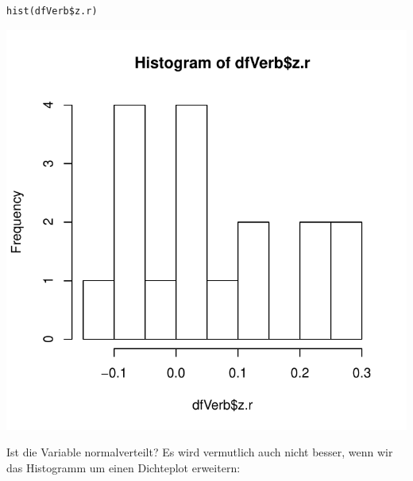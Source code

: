 \documentclass[normalheadings, 10pt]{scrartcl}\usepackage{graphicx, color}
\makeatletter
\def\maxwidth{ %
  \ifdim\Gin@nat@width>\linewidth
    \linewidth
  \else
    \Gin@nat@width
  \fi
}
\newenvironment{kframe}{%
 \def\at@end@of@kframe{}%
 \ifinner\ifhmode%
  \def\at@end@of@kframe{\end{minipage}}%
  \begin{minipage}{\columnwidth}%
 \fi\fi%
 \def\FrameCommand##1{\hskip\@totalleftmargin \hskip-\fboxsep
 \colorbox{shadecolor}{##1}\hskip-\fboxsep
     \hskip-\linewidth \hskip-\@totalleftmargin \hskip\columnwidth}%
 \MakeFramed {\advance\hsize-\width
   \@totalleftmargin\z@ \linewidth\hsize
   \@setminipage}}%
 {\par\unskip\endMakeFramed%
 \at@end@of@kframe}
\newenvironment{knitrout}{}{} %
\makeatother
\begin{document}
\begin{rbsp}
\begin{knitrout}
\color{fgcolor}\begin{kframe}
\begin{verbatim}
hist(dfVerb$z.r)
\end{verbatim}
\end{kframe}
\includegraphics[width=\maxwidth]{fig/assign-1-1-11_2} 

\end{knitrout}

\end{rbsp}

\pagebreak

Ist die Variable normalverteilt? Es wird vermutlich auch nicht besser, wenn wir
das Histogramm um einen Dichteplot erweitern:
\end{document}
